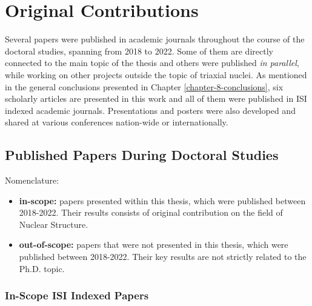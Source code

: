 \chapter{Original Contributions}
\label{appendix:contributions}

Several papers were published in academic journals throughout the course of the doctoral studies, spanning from 2018 to 2022. Some of them are directly connected to the main topic of the thesis and others were published \emph{in parallel}, while working on other projects outside the topic of triaxial nuclei. As mentioned in the general conclusions presented in Chapter \ref{chapter-8-conclusions}, six scholarly articles are presented in this work and all of them were published in ISI indexed academic journals. Presentations and posters were also developed and shared at various conferences nation-wide or internationally. 

\section{Published Papers During Doctoral Studies}

Nomenclature:
\begin{itemize}
    \item \textbf{in-scope:} papers presented within this thesis, which were published between 2018-2022. Their results consists of original contribution on the field of Nuclear Structure. 
    \item \textbf{out-of-scope:} papers that were not presented in this thesis, which were published between 2018-2022. Their key results are not strictly related to the Ph.D. topic.
\end{itemize}

\subsection{In-Scope ISI Indexed Papers}

